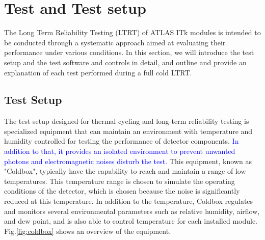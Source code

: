 
\chapter{Test and Test setup} %

\label{Test} %

The Long Term Reliability Testing (LTRT) of ATLAS ITk modules is intended to be conducted through a systematic approach aimed at evaluating their performance under various conditions. In this section, we will introduce the test setup and the test software and controls in detail, and outline and provide an explanation of each test performed during a full cold LTRT.\\

\section{Test Setup}

The test setup designed for thermal cycling and long-term reliability testing is specialized equipment that can maintain an environment with temperature and humidity controlled for testing the performance of detector components. \textcolor{blue}{In addition to that, it provides an isolated environment to prevent unwanted photons and electromagnetic noises disturb the test.} This equipment, known as "Coldbox", typically have the capability to reach and maintain a range of low temperatures. This temperature range is chosen to simulate the operating conditions of the detector, which is chosen because the noise is significantly reduced at this temperature. In addition to the temperature, Coldbox regulates and monitors several environmental parameters such as relative humidity, airflow, and dew point, and is also able to control temperature for each installed module. Fig.\ref{fig:coldbox} shows an overview of the equipment. \\

